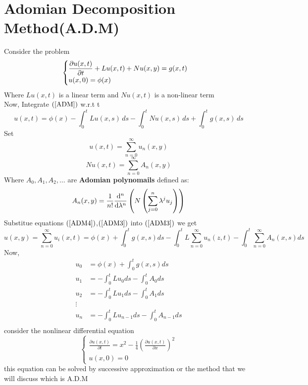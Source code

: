 \documentclass[]{article}
\begin{document}
\section {Adomian Decomposition Method(A.D.M)}
Consider the problem
\begin{equation}
    \label{ADM}
    \begin{cases}
         \displaystyle \pdv{u(x,t)}{t} + Lu(x,t) + Nu(x,y) = g(x,t)
         \\
         \displaystyle u(x,0) = \phi(x)
     \end{cases}
 \end{equation}
Where $Lu(x,t)$ is a linear term and $Nu(x,t)$ is a non-linear term\\
Now, Integrate $(\ref{ADM})$ w.r.t t\\
\begin{equation*}
    \label{ADM3}
    u(x,t) = \phi(x) - \int_0^t Lu(x,s) \,ds  - \int_0^t Nu(x,s) \,ds  + \int_0^t g(x,s) \,ds
\end{equation*}
Set
 \begin{equation}
    \label{ADM4}
    u(x,t) = \sum_{n=0}^\infty u_n(x,y)
\end{equation} 
\begin{equation}
    \label{ADM5}
    Nu(x,t) = \sum_{n=0}^\infty A_n(x,y)
\end{equation}   
Where $A_0,A_1,A_2,\dots$ are \textbf{Adomian polynomails} defined as:
\begin{equation}
    \label{ADM6}
    A_n(x,y) = \frac{1}{n!} \dv[n]{}{\lambda} \left( N \left( \sum_{j=0}^{n}\lambda^j u_j \right) \right)
\end{equation}
Substitue equations $(\ref{ADM4})$,$(\ref{ADM3})$ into $(\ref{ADM3})$ we get 
\begin{equation}
    \label{ADM7}
   u(x,y) = \sum_{n=0}^{\infty}u_i(x,t) = \phi(x) + \int_0^t g(x,s) ds - \int_0^t L \sum_{n=0}^{\infty}u_n(z,t) - \int_0^t \sum_{n=0}^{\infty}A_n(x,s) ds
\end{equation}
Now,
\begin{align*}
    u_0 &= \phi(x) + \int_0^t g(x,s) ds\\
    u_1 &= -\int_0^t Lu_0  ds - \int_0^t A_0 ds\\
    u_2 &= -\int_0^t Lu_1  ds - \int_0^t A_1 ds\\
    \vdots \\
    u_n &= -\int_0^t Lu_{n-1}  ds - \int_0^t A_{n-1} ds\\
\end{align*}
consider the nonlinear differential equation 
\begin{equation}
    \begin{cases}
         \displaystyle \frac{\partial u(x,t)}{\partial t} = x^2 - \frac{1}{4}(\frac{\partial u(x,t)}{\partial x})^2
         \\
         \displaystyle u(x,0) = 0
     \end{cases}
 \end{equation}
this equation can be solved by successive approximation or the method that we will discuss which is A.D.M 
\end{document}
